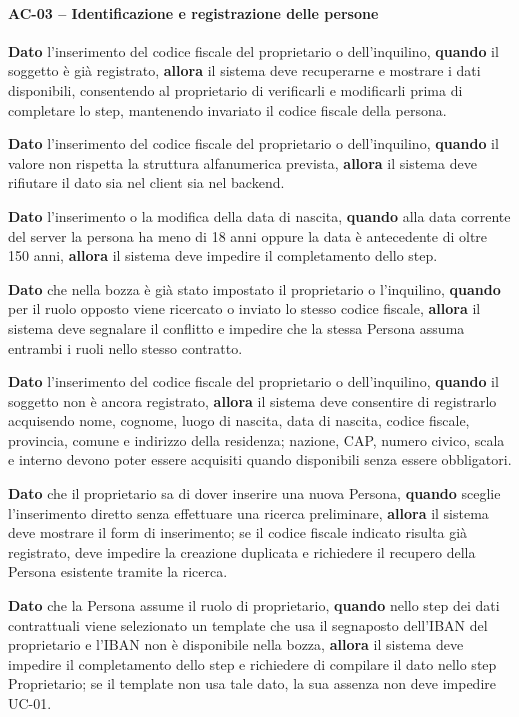 \documentclass[12pt,a4paper]{article}
\begin{document}
\paragraph{AC-03 -- Identificazione e registrazione delle persone}

\textbf{Dato} l'inserimento del codice fiscale del proprietario o dell'inquilino,
\textbf{quando} il soggetto è già registrato,
\textbf{allora} il sistema deve recuperarne e mostrare i dati disponibili, consentendo al
proprietario di verificarli e modificarli prima di completare lo step, mantenendo invariato
il codice fiscale della persona.

\textbf{Dato} l'inserimento del codice fiscale del proprietario o dell'inquilino,
\textbf{quando} il valore non rispetta la struttura alfanumerica prevista,
\textbf{allora} il sistema deve rifiutare il dato sia nel client sia nel backend.

\textbf{Dato} l'inserimento o la modifica della data di nascita,
\textbf{quando} alla data corrente del server la persona ha meno di 18 anni oppure
la data è antecedente di oltre 150 anni,
\textbf{allora} il sistema deve impedire il completamento dello step.

\textbf{Dato} che nella bozza è già stato impostato il proprietario o l'inquilino,
\textbf{quando} per il ruolo opposto viene ricercato o inviato lo stesso codice fiscale,
\textbf{allora} il sistema deve segnalare il conflitto e impedire che la stessa Persona
assuma entrambi i ruoli nello stesso contratto.

\textbf{Dato} l'inserimento del codice fiscale del proprietario o dell'inquilino,
\textbf{quando} il soggetto non è ancora registrato,
\textbf{allora} il sistema deve consentire di registrarlo acquisendo nome,
cognome, luogo di nascita, data di nascita, codice fiscale, provincia, comune e indirizzo
della residenza; nazione, CAP, numero civico, scala e interno devono poter essere acquisiti
quando disponibili senza essere obbligatori.

\textbf{Dato} che il proprietario sa di dover inserire una nuova Persona,
\textbf{quando} sceglie l'inserimento diretto senza effettuare una ricerca preliminare,
\textbf{allora} il sistema deve mostrare il form di inserimento; se il codice fiscale indicato
risulta già registrato, deve impedire la creazione duplicata e richiedere il recupero della
Persona esistente tramite la ricerca.

\textbf{Dato} che la Persona assume il ruolo di proprietario,
\textbf{quando} nello step dei dati contrattuali viene selezionato un template che usa il segnaposto
dell'IBAN del proprietario e l'IBAN non è disponibile nella bozza,
\textbf{allora} il sistema deve impedire il completamento dello step e richiedere di compilare il dato
nello step Proprietario; se il template non usa tale dato, la sua assenza non deve impedire UC-01.
\end{document}
